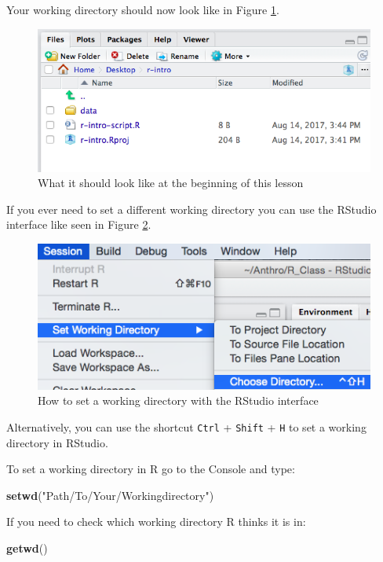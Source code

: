 \documentclass[]{book}
\newenvironment{Shaded}{\begin{snugshade}}{\end{snugshade}}
\newcommand{\KeywordTok}[1]{\textcolor[rgb]{0.13,0.29,0.53}{\textbf{#1}}}
\newcommand{\StringTok}[1]{\textcolor[rgb]{0.31,0.60,0.02}{#1}}
\newcommand{\NormalTok}[1]{#1}
\begin{document}
Your working directory should now look like in Figure
\ref{fig:working-dir}.

\begin{figure}
\includegraphics[width=0.6\linewidth]{img/Rproject-setup} \caption{What it should look like at the beginning of this lesson}\label{fig:working-dir}
\end{figure}

If you ever need to set a different working directory you can use the
RStudio interface like seen in Figure \ref{fig:set-working-dir}.

\begin{figure}
\includegraphics[width=0.6\linewidth]{img/setWD} \caption{How to set a working directory with the RStudio interface}\label{fig:set-working-dir}
\end{figure}

Alternatively, you can use the shortcut \texttt{Ctrl} + \texttt{Shift} +
\texttt{H} to set a working directory in RStudio.

To set a working directory in R go to the Console and type:

\begin{Shaded}
\begin{Highlighting}[]
\KeywordTok{setwd}\NormalTok{(}\StringTok{"Path/To/Your/Workingdirectory"}\NormalTok{)}
\end{Highlighting}
\end{Shaded}

If you need to check which working directory R thinks it is in:

\begin{Shaded}
\begin{Highlighting}[]
\KeywordTok{getwd}\NormalTok{()}
\end{Highlighting}
\end{Shaded}
\end{document}
